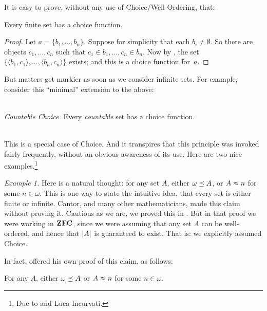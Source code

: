 \documentclass[../../../include/open-logic-section]{subfiles}
\begin{document}

It is easy to prove, without any use of Choice/Well-Ordering, that:

\begin{lem}[in $\Zminus$]
Every finite set has a choice function. 
\end{lem}

\begin{proof}
Let $a = \{b_1, \ldots, b_n\}$. Suppose for simplicity that each $b_i
\neq \emptyset$. So there are objects $c_1, \ldots, c_n$ such that
$c_1 \in b_1, \ldots, c_n \in b_n$. Now by
, the set $\{\langle b_1,
c_1\rangle , \ldots, \langle b_n, c_n\rangle\}$ exists; and this is a
choice function for~$a$.
\end{proof}

But matters get murkier as soon as we consider infinite sets. For
example, consider this ``minimal'' extension to the above:

\
\\\emph{Countable Choice.} Every \emph{countable} set has a choice function. 

\
\\
This is a special case of Choice. And it transpires that this
principle was invoked fairly frequently, without  an obvious awareness
of its use. Here are two nice examples.\footnote{Due to
\citet[\S9.4]{Potter2004} and Luca Incurvati.}

\emph{Example 1.} 
Here is a natural thought: for any set $A$, either
$\omega \preceq A$, or $A \approx n$ for some $n \in \omega$. This
is one way to state the intuitive idea, that every set is either
finite or infinite. Cantor, and many other mathematicians, made this
claim without proving it. Cautious as we are, we proved this in
\olref[cardinals][classing]{generalinfinitycharacter}. But
in that proof we were working in $\mathbf{ZFC}$, since we were assuming that
any set $A$ can be well-ordered, and hence that $\left| A \right|$ is
guaranteed to exist. That is: we explicitly assumed Choice.

In fact, \citet{Dedekind1888} offered his own proof of
this claim, as follows:

\begin{thm}
For any $A$, either $\omega \preceq A$ or $A \approx n$ for some
$n \in \omega$.
\end{thm}
\end{document}
